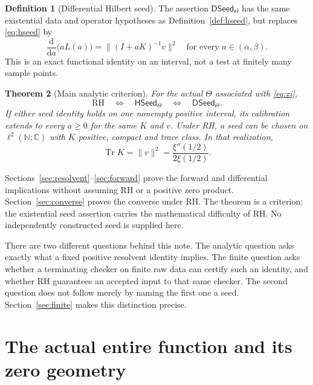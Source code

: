 \documentclass[11pt,a4paper]{article}
\numberwithin{equation}{section}
\newtheorem{theorem}{Theorem}[section]
\theoremstyle{definition}
\newtheorem{definition}[theorem]{Definition}
\theoremstyle{remark}
\newcommand{\C}{\mathbb C}
\newcommand{\N}{\mathbb N}
\newcommand{\norm}[1]{\lVert #1\rVert}
\newcommand{\RH}{\mathrm{RH}}
\newcommand{\HSeed}{\mathsf{HSeed}_{\Theta}}
\newcommand{\DSeed}{\mathsf{DSeed}_{\Theta}}
\DeclareMathOperator{\Tr}{Tr}
\begin{document}
\begin{definition}[Differential Hilbert seed]\label{def:dseed}
The assertion $\DSeed$ has the same existential data and operator
hypotheses as Definition~\ref{def:hseed}, but replaces
\eqref{eq:hseed} by
\begin{equation}\label{eq:dseed}
\frac{\mathrm d}{\mathrm da}\bigl(aL(a)\bigr)
=\norm{(I+aK)^{-1}v}^{2}
\quad\text{for every }a\in(\alpha,\beta).
\end{equation}
This is an exact functional identity on an interval, not a test at finitely
many sample points.
\end{definition}

\begin{theorem}[Main analytic criterion]\label{thm:main}
For the actual $\Theta$ associated with \eqref{eq:xi},
\begin{equation}\label{eq:main}
\RH\quad\Longleftrightarrow\quad\HSeed
\quad\Longleftrightarrow\quad\DSeed.
\end{equation}
If either seed identity holds on one nonempty positive interval, its
calibration extends to every $a\geq0$ for the same $K$ and $v$.
Under RH, a seed can be chosen on $\ell^2(\N;\C)$ with $K$ positive,
compact and trace class. In that realization,
\begin{equation}\label{eq:normalization-intro}
\Tr K=\norm v^2=\frac{\xi''(1/2)}{2\xi(1/2)}.
\end{equation}
\end{theorem}

Sections~\ref{sec:resolvent}--\ref{sec:forward} prove the forward and
differential implications without assuming RH or a positive zero product.
Section~\ref{sec:converse} proves the converse under RH. The theorem is
a criterion: the existential seed assertion carries the mathematical
difficulty of RH. No independently constructed seed is supplied here.

There are two different questions behind this note. The analytic question
asks exactly what a fixed positive resolvent identity implies. The finite
question asks whether a terminating checker on finite raw data can certify
such an identity, and whether RH guarantees an accepted input to that same
checker. The second question does not follow merely by naming the first
one a seed. Section~\ref{sec:finite} makes this distinction precise.

\section[Entire function and zero geometry]{The actual entire function and its zero geometry}\label{sec:theta}
\end{document}
